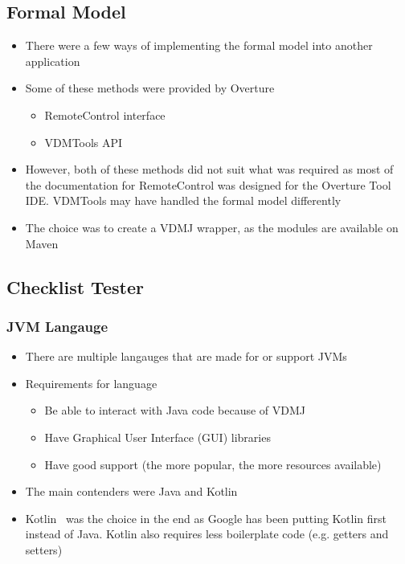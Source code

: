 \documentclass[../dissertation.tex]{subfiles}
\begin{document}
\subsection{Formal Model}
\begin{itemize}
  \item There were a few ways of implementing the formal model into another application
  \item Some of these methods were provided by Overture~\cite{overture-remote}
    \begin{itemize}
      \item RemoteControl interface
      \item VDMTools API~\cite{vdmtoolbox-api}
    \end{itemize}
  \item However, both of these methods did not suit what was required as most of the
    documentation for RemoteControl was designed for the Overture Tool IDE. VDMTools
    may have handled the formal model differently
  \item The choice was to create a VDMJ wrapper, as the modules are available on Maven
\end{itemize}

\subsection{Checklist Tester}
\subsubsection{JVM Langauge}
\begin{itemize}
  \item There are multiple langauges that are made for or support JVMs~\cite{jvm-alt-lang}
  \item Requirements for language
    \begin{itemize}
      \item Be able to interact with Java code because of VDMJ
      \item Have Graphical User Interface (GUI) libraries
      \item Have good support (the more popular, the more resources available)
    \end{itemize}
  \item The main contenders were Java and Kotlin~\cite{kotlin}
  \item Kotlin~\cite{kotlin} was the choice in the end as Google has been putting Kotlin first
    instead of Java. Kotlin also requires less boilerplate code (e.g. getters and setters)~\cite{android-kotlin}

\end{itemize}
\end{document}
